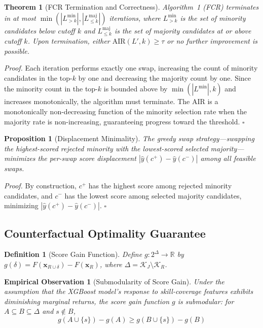 \documentclass[smallcondensed,numbers]{sn-jnl}
\newtheorem{theorem}{Theorem}
\newtheorem{proposition}{Proposition}
\newtheorem{definition}{Definition}
\newtheorem{empiricalobs}{Empirical Observation}
\begin{document}
\begin{theorem}[FCR Termination and Correctness]\label{thm:fcr}
Algorithm~1 (FCR) terminates in at most $\min(|L_{>\!k}^{\text{min}}|, |L_{\leq k}^{\text{maj}}|)$ iterations, where $L_{>\!k}^{\text{min}}$ is the set of minority candidates below cutoff $k$ and $L_{\leq k}^{\text{maj}}$ is the set of majority candidates at or above cutoff $k$. Upon termination, either $\mathrm{AIR}(L', k) \geq \tau$ or no further improvement is possible.
\end{theorem}

\textit{Proof.} Each iteration performs exactly one swap, increasing the count of minority candidates in the top-$k$ by one and decreasing the majority count by one. Since the minority count in the top-$k$ is bounded above by $\min(|L^{\text{min}}|, k)$ and increases monotonically, the algorithm must terminate. The AIR is a monotonically non-decreasing function of the minority selection rate when the majority rate is non-increasing, guaranteeing progress toward the threshold. \hfill $\square$

\begin{proposition}[Displacement Minimality]\label{prop:disp}
The greedy swap strategy---swapping the highest-scored rejected minority with the lowest-scored selected majority---minimizes the per-swap score displacement $|\hat{y}(c^+) - \hat{y}(c^-)|$ among all feasible swaps.
\end{proposition}

\textit{Proof.} By construction, $c^+$ has the highest score among rejected minority candidates, and $c^-$ has the lowest score among selected majority candidates, minimizing $|\hat{y}(c^+) - \hat{y}(c^-)|$. \hfill $\square$

\subsection{Counterfactual Optimality Guarantee}
\label{sec:cf_theory}

\begin{definition}[Score Gain Function]
Define $g: 2^\Delta \to \mathbb{R}$ by $g(\delta) = F(\mathbf{x}_{R \cup \delta}) - F(\mathbf{x}_R)$, where $\Delta = \mathcal{K}_J \setminus \mathcal{K}_R$.
\end{definition}

\setcounter{empiricalobs}{3}
\begin{empiricalobs}[Submodularity of Score Gain]\label{prop:submod}
Under the assumption that the XGBoost model's response to skill-coverage features exhibits diminishing marginal returns, the score gain function $g$ is submodular: for $A \subseteq B \subseteq \Delta$ and $s \notin B$,
\begin{equation}
    g(A \cup \{s\}) - g(A) \geq g(B \cup \{s\}) - g(B)
\end{equation}
\end{empiricalobs}
\end{document}
